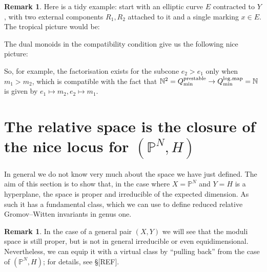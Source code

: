 \documentclass[11pt]{amsart}
\newcommand{\PP}{\mathbb P}
\renewcommand{\to}{\rightarrow}
\theoremstyle{definition}
\theoremstyle{definition}
\newtheorem{remark}[thm]{Remark}
\begin{document}
\begin{remark}
 Here is a tidy example: start with an elliptic curve $E$ contracted to $Y$, with two external components $R_1, R_2$ attached to it and a single marking $x\in E$. The tropical picture would be:
\begin{center}
\end{center}
The dual monoids in the compatibility condition give us the following nice picture:
\begin{center}
\end{center}
So, for example, the factorisation exists for the subcone $e_2>e_1$ only when $m_1>m_2$, which is compatible with the fact that $\mathbb N^2=Q_{\rm{min}}^{\rm{prestable}}\to Q_{\rm{min}}^{\rm{log.map}}=\mathbb N$ is given by
$e_1\mapsto m_2, e_2\mapsto m_1$.
\end{remark}


\section{The relative space is the closure of the nice locus for $(\PP^N,H)$}
\noindent In general we do not know very much about the space we have just defined. The aim of this section is to show that, in the case where $X=\PP^N$ and $Y=H$ is a hyperplane, the space is proper and irreducible of the expected dimension. As such it has a fundamental class, which we can use to define reduced relative Gromov--Witten invariants in genus one.

\begin{remark} In the case of a general pair $(X,Y)$ we will see that the moduli space is still proper, but is not in general irreducible or even equidimensional. Nevertheless, we can equip it with a virtual class by ``pulling back'' from the case of $(\PP^N,H)$; for details, see \S [REF]. \end{remark}
\end{document}
